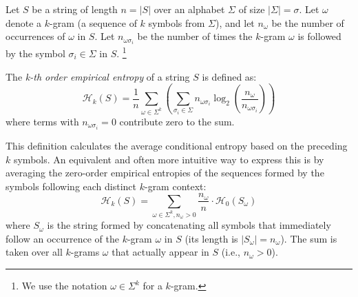 \noindent Let $S$ be a string of length $n = |S|$ over an alphabet $\Sigma$ of size $|\Sigma| = \sigma$. Let $\omega$ denote a $k$-gram (a sequence of $k$ symbols from $\Sigma$), and let $n_\omega$ be the number of occurrences of $\omega$ in $S$. Let $n_{\omega \sigma_i}$ be the number of times the $k$-gram $\omega$ is followed by the symbol $\sigma_i \in \Sigma$ in $S$. \footnote{We use the notation $\omega \in \Sigma^k$ for a $k$-gram.}

\begin{definition} \label{def:kth_order_empirical_entropy}
    The \emph{k-th order empirical entropy} of a string $S$ is defined as:
    \begin{equation}\label{eq:kth_order_entropy_formula1}
        \mathcal{H}_k(S) = \frac{1}{n} \sum_{\omega \in \Sigma^k} \left ( \sum_{\sigma_i \in \Sigma} n_{\omega\sigma_i} \log_2 \left ( \frac{n_\omega}{n_{\omega\sigma_i}} \right) \right )
    \end{equation}
    where terms with $n_{\omega\sigma_i} = 0$ contribute zero to the sum.
\end{definition}

\noindent This definition calculates the average conditional entropy based on the preceding $k$ symbols. An equivalent and often more intuitive way to express this is by averaging the zero-order empirical entropies of the sequences formed by the symbols following each distinct $k$-gram context:
\begin{equation}\label{eq:kth_order_entropy_formula2}
    \mathcal{H}_k(S) = \sum_{\omega \in \Sigma^k, n_\omega > 0} \frac{n_\omega}{n} \cdot \mathcal{H}_0(S_\omega)
\end{equation}
where $S_\omega$ is the string formed by concatenating all symbols that immediately follow an occurrence of the $k$-gram $\omega$ in $S$ (its length is $|S_\omega| = n_\omega$). The sum is taken over all $k$-grams $\omega$ that actually appear in $S$ (i.e., $n_\omega > 0$).


